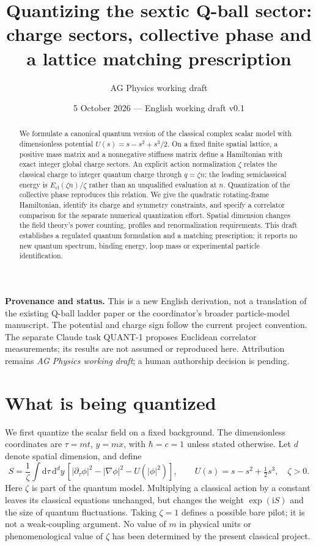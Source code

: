 \documentclass[11pt,a4paper]{article}
\title{Quantizing the sextic Q-ball sector:\\charge sectors, collective phase and a lattice matching prescription}
\author{AG Physics working draft}
\date{5 October 2026 --- English working draft v0.1}
\newcommand{\dd}{\mathrm d}
\newcommand{\ii}{\mathrm i}
\begin{document}
\maketitle
\begin{abstract}
We formulate a canonical quantum version of the classical complex scalar
model with dimensionless potential $U(s)=s-s^2+s^3/2$.
On a fixed finite spatial lattice, a positive mass matrix and a nonnegative
stiffness matrix define a Hamiltonian with exact integer global charge sectors.
An explicit action normalization $\zeta$ relates the classical charge to
integer quantum charge through $q=\zeta n$; the leading semiclassical energy
is $E_{\mathrm{cl}}(\zeta n)/\zeta$ rather than an unqualified evaluation at $n$.
Quantization of the collective phase reproduces this relation. We give the
quadratic rotating-frame Hamiltonian, identify its charge and symmetry
constraints, and specify a correlator comparison for the separate numerical
quantization effort. Spatial dimension changes the field theory's power
counting, profiles and renormalization requirements. This draft establishes
a regulated quantum formulation and a matching prescription; it reports no
new quantum spectrum, binding energy, loop mass or experimental particle identification.
\end{abstract}

\noindent\textbf{Provenance and status.}
This is a new English derivation, not a translation of the existing Q-ball
ladder paper or the coordinator's broader particle-model manuscript.
The potential and charge sign follow the current project convention.
The separate Claude task QUANT-1 proposes Euclidean correlator measurements;
its results are not assumed or reproduced here. Attribution remains
\emph{AG Physics working draft}; a human authorship decision is pending.

\section{What is being quantized}
We first quantize the scalar field on a fixed background. The dimensionless
coordinates are $\tau=m t$, $y=m x$, with $\hbar=c=1$ unless stated otherwise.
Let $d$ denote spatial dimension, and define
\begin{equation}\label{eq:action}
 S=\frac1\zeta\int\dd\tau\,\dd^dy\,
 \left[|\partial_\tau\phi|^2-|\nabla\phi|^2-U(|\phi|^2)\right],
 \qquad U(s)=s-s^2+\tfrac12s^3,\quad \zeta>0.
\end{equation}
Here $\zeta$ is part of the quantum model. Multiplying a classical action
by a constant leaves its classical equations unchanged, but changes the
weight $\exp(\ii S)$ and the size of quantum fluctuations. Taking
$\zeta=1$ defines a possible bare pilot; it is not a weak-coupling argument.
No value of $m$ in physical units or phenomenological value of $\zeta$ has
been determined by the present classical project.
\end{document}
